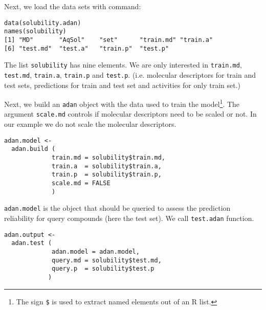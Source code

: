 \documentclass[a4paper]{article}
\begin{document}
Next, we load the data sets with command:

%           


\begin{verbatim}
data(solubility.adan)
names(solubility)
[1] "MD"       "AqSol"    "set"      "train.md" "train.a" 
[6] "test.md"  "test.a"   "train.p"  "test.p" 
\end{verbatim}

The list \texttt{solubility} has nine elements. We are only interested in
\texttt{train.md}, \texttt{test.md}, \texttt{train.a}, \texttt{train.p} and \texttt{test.p}. (i.e. molecular descriptors for train and test sets, predictions for train and test set and activities for only train set.)
 
Next, we build an \texttt{adan} object with the data used to train the model\footnote{The sign \texttt{\$} is used to extract named elements out of an R list.}. The argument \texttt{scale.md} controls if molecular descriptors need to be scaled or not. In our example we do not scale the molecular descriptors.

\begin{verbatim}
adan.model <- 
  adan.build ( 
             train.md = solubility$train.md, 
             train.a  = solubility$train.a,
             train.p  = solubility$train.p, 
             scale.md = FALSE
             )
\end{verbatim}

\texttt{adan.model} is the object that should be queried to assess the prediction reliability for query compounds (here the test set). We call \texttt{test.adan} function.
\begin{verbatim}
adan.output <- 
  adan.test ( 
             adan.model = adan.model,
             query.md = solubility$test.md, 
             query.p  = solubility$test.p 
            )

\end{verbatim}
\end{document}
